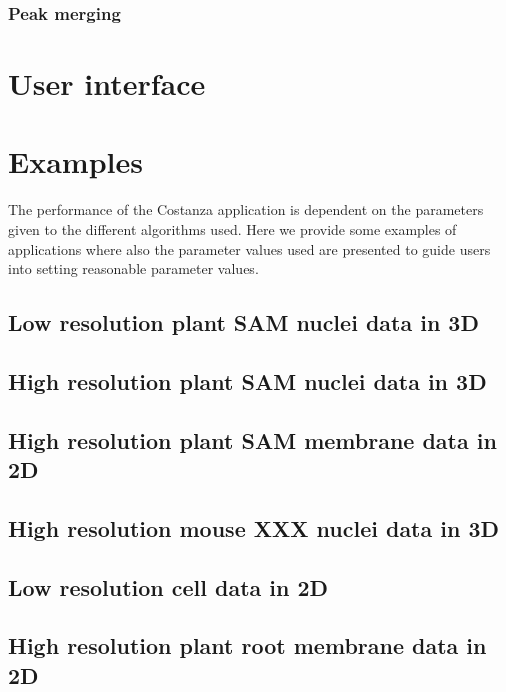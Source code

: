 \documentclass[a4paper,12pt]{article}
\begin{document}
\subsubsection{Peak merging}

\section{User interface}

\section{Examples}

The performance of the Costanza application is dependent on the
parameters given to the different algorithms used. Here we provide
some examples of applications where also the parameter values used are
presented to guide users into setting reasonable parameter values.

\subsection{Low resolution plant SAM nuclei data in 3D}

\subsection{High resolution plant SAM nuclei data in 3D}

\subsection{High resolution plant SAM membrane data in 2D}

\subsection{High resolution mouse XXX nuclei data in 3D}

\subsection{Low resolution  cell data in 2D}

\subsection{High resolution plant root membrane data in 2D}



\end{document}
